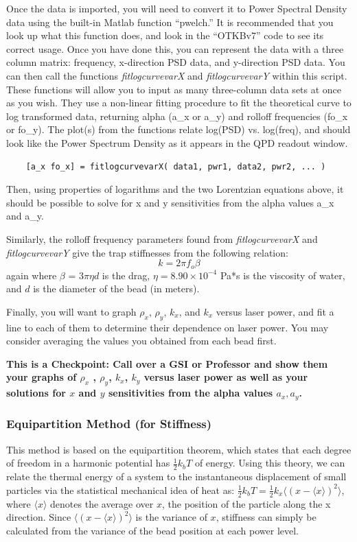 \documentclass{../lab}
\begin{document}
Once the data is imported, you will need to convert it to Power Spectral Density data using the built-in Matlab function ``pwelch.'' It is recommended that you look up what this function does, and look in the ``OTKBv7'' code to see its correct usage. Once you have done this, you can represent the data with a three column matrix: frequency, x-direction PSD data, and y-direction PSD data. You can then call the functions \emph{fitlogcurvevarX} and \emph{fitlogcurvevarY} within this script. These functions will allow you to input as many three-column data sets at once as you wish. They use a non-linear fitting procedure to fit the theoretical curve to log transformed data, returning alpha (a\_x or a\_y) and rolloff frequencies (fo\_x or fo\_y). The plot(s) from the functions relate log(PSD) vs. log(freq), and should look like the Power Spectrum Density as it appears in the QPD readout window.
\begin{verbatim}
    [a_x fo_x] = fitlogcurvevarX( data1, pwr1, data2, pwr2, ... )
\end{verbatim}
Then, using properties of logarithms and the two Lorentzian equations above, it should be possible to solve for x and y sensitivities from the alpha values a\_x and a\_y.

Similarly, the rolloff frequency parameters found from \emph{fitlogcurvevarX} and \emph{fitlogcurvevarY} give the trap stiffnesses from the following relation:
\[
    k = 2 \pi f_o \beta
\]
again where $\beta$ = $3\pi\eta d$  is the drag, $\eta = 8.90 \times 10^{-4}$ Pa*s is the viscosity of water, and $d$ is the diameter of the bead (in meters).

Finally, you will want to graph $\rho_x$, $\rho_y$, $k_x$, and $k_x$ versus laser power, and fit a line to each of them to determine their dependence on laser power. You may consider averaging the values you obtained from each bead first.


\textbf{This is a Checkpoint: Call over a GSI or Professor and show them your graphs of $\rho_x$ , $\rho_y$, $k_x$, $k_y$ versus laser power as well as your solutions for $x$ and $y$ sensitivities from the alpha values $a_x, a_y$.}

\subsubsection{Equipartition Method (for Stiffness)}

This method is based on the equipartition theorem, which states that each degree of freedom in a harmonic potential has $\frac{1}{2}k_bT $ of energy. Using this theory, we can relate the thermal energy of a system to the instantaneous displacement of small particles via the statistical mechanical idea of heat as: $  \frac{1}{2}k_b T = \frac{1}{2}k_x \langle(x-\langle x\rangle)^2\rangle $, where $\langle x\rangle $ denotes the average over $x$, the position of the particle along the x direction. Since $\langle(x-\langle x\rangle)^2\rangle $ is the variance of $x$, stiffness can simply be calculated from the variance of the bead position at each power level.
\end{document}
